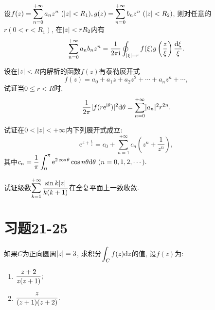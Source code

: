 \begin{yyEx}
	设$\begin{lgathered}
		f(z) = \sum_{n = 0}^{+\infty}a_nz^n~(\abs{z}<R_1),g(z) = \sum_{n = 0}^{+\infty}b_nz^n~(\abs{z}<R_2)
	\end{lgathered}$, 则对任意的$r(0<r<R_1)$, 在$\lvert z\rvert<rR_2$内有
	\begin{equation*}
		\sum_{n = 0}^{+\infty}a_nb_nz^n = \frac{1}{2\pi\mathrm{i}}\oint_{\lvert\xi\rvert = r}f(\xi)g\left( \frac{z}{\xi} \right)\frac{\mathrm{d}\xi}{\xi}.
	\end{equation*}
\end{yyEx}

\begin{yyEx}
	设在$\lvert z\rvert<R$内解析的函数$f(z)$有泰勒展开式\begin{equation*}
		f(z) = a_0 + a_1z+a_2z^2+\cdots + a_nz^n + \cdots,
	\end{equation*}
	试证当$0\leqslant r<R$时,\begin{equation*}
		\frac{1}{2\pi}\lvert f(r\mathrm{e}^{\mathrm{i}\theta})\rvert^2\mathrm{d}\theta = \sum_{n = 0}^{+\infty}\lvert a_n\rvert^2r^{2n}.
	\end{equation*}
\end{yyEx}

\begin{yyEx}
	试证在$0<\lvert z\rvert<+\infty$内下列展开式成立:
	\begin{equation*}
		\mathrm{e}^{z+\frac{1}{z}} = c_0 + \sum_{n=1}^{+\infty}c_n\left( z^n + \frac{1}{z^n} \right),
	\end{equation*}
	其中$\begin{lgathered}
		c_n = \frac{1}{\pi}\int_{0}^{\pi}\mathrm{e}^{2\cos\theta}\cos n\theta\mathrm{d}\theta~(n = 0,1,2,\cdots).
	\end{lgathered}$
\end{yyEx}

\begin{yyEx}
	试证级数$\begin{lgathered}
		\sum_{k=1}^{+\infty}\frac{\sin k\abs{z}}{k(k+1)}
	\end{lgathered}$在全复平面上一致收敛.
\end{yyEx}

\section{习题21-25}

\begin{yyEx}
	如果$C$为正向圆周$\lvert z\rvert = 3$, 求积分$\begin{lgathered}
		\int_Cf(z)\mathrm{d}z
	\end{lgathered}$的值, 设$f(z)$为:
	\begin{enumerate}
		\item $\begin{lgathered}
			\frac{z+2}{z(z+1)};
		\end{lgathered}$
		\item $\begin{lgathered}
		\frac{z}{(z+1)(z+2)}.
		\end{lgathered}$
	\end{enumerate}
\end{yyEx}

